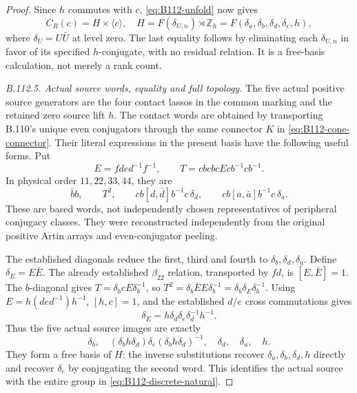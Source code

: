 \begin{proof}
Since $h$ commutes with $c$, \eqref{eq:B112-unfold} now gives
\begin{equation}\label{eq:B112-discrete-natural}
 C_R(c)=H\times\langle c\rangle,
 \quad H=F(\delta_{U,n})\rtimes\mathbb Z_h
       =F(\delta_a,\delta_b,\delta_d,\delta_e,h),
\end{equation}
where $\delta_U=U\bar U$ at level zero. The last equality follows
by eliminating each $\delta_{U,n}$ in favor of its specified
$h$-conjugate, with no residual relation. It is a free-basis
calculation, not merely a rank count.

\emph{B.112.5. Actual source words, equality and full topology.}
The five actual positive source generators are the four contact
lassos in the common marking and the retained zero source lift $h$.
The contact words are obtained by transporting B.110's unique even
conjugators through the same connector $K$ in
\eqref{eq:B112-cone-connector}. Their literal expressions in the
present basis have the following useful forms. Put
\[
 E=fde d^{-1}f^{-1},\qquad
 T=cbcb cEcb^{-1}cb^{-1}.
\]
In physical order $11,22,33,44$, they are
\begin{equation}\label{eq:B112-actual-source-words}
 \bar b b,\qquad T^2,\qquad
 cb[d,\bar d]b^{-1}c\,\delta_d,\qquad
 cb[a,\bar a]b^{-1}c\,\delta_a.
\end{equation}
These are based words, not independently chosen representatives of
peripheral conjugacy classes. They were reconstructed independently
from the original positive Artin arrays and even-conjugator peeling.

The established diagonals reduce the first, third and fourth to
$\delta_b,\delta_d,\delta_a$. Define $\delta_E=E\bar E$.
The already established $\beta_{22}$ relation, transported by $fd$,
is $[E,\bar E]=1$. The $b$-diagonal gives
$T=\delta_b cE\delta_b^{-1}$, so
$T^2=\delta_b\bar E E\delta_b^{-1}
      =\delta_b\delta_E\delta_b^{-1}$. Using
$E=h(de d^{-1})h^{-1}$, $[h,c]=1$, and the established $d/e$
cross commutations gives
\[
 \delta_E=h\delta_d\delta_e\delta_d^{-1}h^{-1}.
\]
Thus the five actual source images are exactly
\begin{equation}\label{eq:B112-source-basis}
 \delta_b,\quad
 (\delta_bh\delta_d)\delta_e(\delta_bh\delta_d)^{-1},\quad
 \delta_d,\quad\delta_a,\quad h.
\end{equation}
They form a free basis of $H$: the inverse substitutions recover
$\delta_a,\delta_b,\delta_d,h$ directly and recover $\delta_e$
by conjugating the second word. This identifies the actual source
with the entire group in \eqref{eq:B112-discrete-natural}.


\end{proof}
